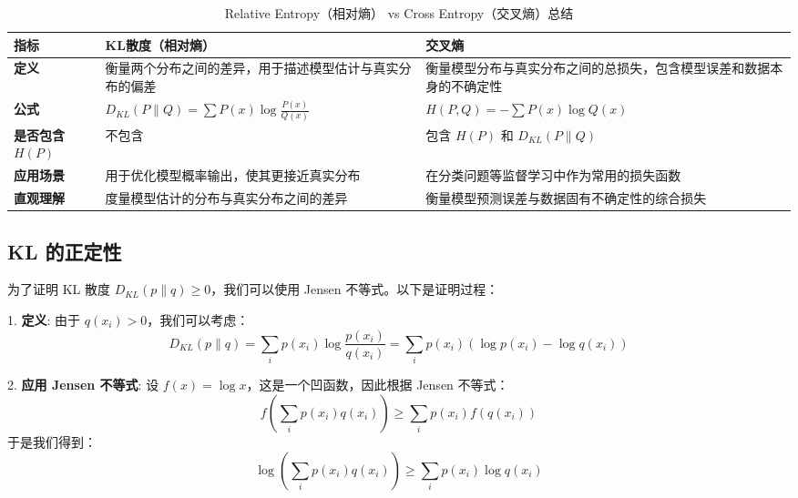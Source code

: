 \documentclass[12pt]{article}
\numberwithin{theorem}{section} %
\numberwithin{definition}{section} %
\numberwithin{assumption}{section} %
\numberwithin{lemma}{section} %
\numberwithin{remark}{section} %
\numberwithin{prop}{section} %
\numberwithin{corollary}{section} %
\numberwithin{example}{section} %
\numberwithin{question}{section} %
\numberwithin{problem}{section} %
\numberwithin{conjecture}{section} %
\numberwithin{append}{section} %
\numberwithin{property}{section} %
\begin{document}
\begin{CJK}{UTF8}{gbsn}
	
	
	
	\begin{table}[h]
		\centering
		\caption{Relative Entropy（相对熵） vs Cross Entropy（交叉熵）总结}
		\begin{tabular}{@{}p{3cm} p{6cm} p{6cm}@{}}
			\toprule
			指标 & KL散度（相对熵） & 交叉熵 \\ \midrule
			\textbf{定义} 
			& 衡量两个分布之间的差异，用于描述模型估计与真实分布的偏差 
			& 衡量模型分布与真实分布之间的总损失，包含模型误差和数据本身的不确定性 \\ \midrule
			\textbf{公式} 
			& $D_{KL}(P \parallel Q) = \sum P(x) \log \frac{P(x)}{Q(x)}$ 
			& $H(P, Q) = -\sum P(x) \log Q(x)$ \\ \midrule
			\textbf{是否包含 $H(P)$} 
			& 不包含 
			& 包含 $H(P)$ 和 $D_{KL}(P \parallel Q)$ \\ \midrule
			\textbf{应用场景} 
			& 用于优化模型概率输出，使其更接近真实分布 
			& 在分类问题等监督学习中作为常用的损失函数 \\ \midrule
			\textbf{直观理解} 
			& 度量模型估计的分布与真实分布之间的差异 
			& 衡量模型预测误差与数据固有不确定性的综合损失 \\ \bottomrule
		\end{tabular}
	\end{table}
	
	
	
	\subsection{KL 的正定性}
	
	为了证明 KL 散度 \( D_{KL}(p \parallel q) \geq 0 \)，我们可以使用 Jensen 不等式。以下是证明过程：
	
	1. \textbf{定义}: 由于 \( q(x_i) > 0 \)，我们可以考虑：
	\begin{equation}
		D_{KL}(p \parallel q) = \sum_{i} p(x_i) \log \frac{p(x_i)}{q(x_i)} = \sum_{i} p(x_i) \left( \log p(x_i) - \log q(x_i) \right)
	\end{equation}
	
	2. \textbf{应用 Jensen 不等式}:
	设 \( f(x) = \log x \)，这是一个凹函数，因此根据 Jensen 不等式：
	\begin{equation}
		f\left( \sum_{i} p(x_i) q(x_i) \right) \geq \sum_{i} p(x_i) f(q(x_i))
	\end{equation}
	于是我们得到：
	\begin{equation}
		\log \left( \sum_{i} p(x_i) q(x_i) \right) \geq \sum_{i} p(x_i) \log q(x_i)
	\end{equation}
	

\end{CJK}
\end{document}

